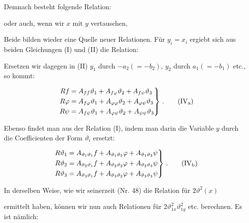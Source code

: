 Demnach besteht folgende Relation:


oder auch, wenn wir $x$ mit $y$ vertauschen,


Beide bilden wieder eine Quelle neuer Relationen. F\"ur $y_i = x_i$ ergiebt sich aus beiden Gleichungen (I) und (II) die Relation:


Ersetzen wir dagegen in (II) $y_1$ durch $-a_2 (= -b_2)$, $y_2$ durch $a_1 (= -b_1)$ etc., so kommt:

\[
\left.
\begin{aligned}
R f &= A_{ff}\vartheta_1 + A_{f\varphi}\vartheta_2 + A_{f\psi}\vartheta_3 \\
R \varphi &= A_{f\varphi}\vartheta_1 + A_{\varphi\varphi}\vartheta_2 + A_{\varphi\psi}\vartheta_3 \\
R \psi &= A_{f\psi}\vartheta_1 + A_{\varphi\psi}\vartheta_2 + A_{\psi\psi}\vartheta_3
\end{aligned}
\right\}\,. \tag{IV$_\text{a}$}
\]

Ebenso findet man aus der Relation (I), indem man darin die Variable $y$ durch die Coefficienten der Form $\vartheta_i$ ersetzt:

\[
\left.
\begin{aligned}
R \vartheta_1 &= A_{\vartheta_1\vartheta_1} f + A_{\vartheta_1\vartheta_2}\varphi + A_{\vartheta_1\vartheta_3}\psi \\
R \vartheta_2 &= A_{\vartheta_2\vartheta_1} f + A_{\vartheta_2\vartheta_2}\varphi + A_{\vartheta_2\vartheta_3}\psi \\
R \vartheta_3 &= A_{\vartheta_3\vartheta_1} f + A_{\vartheta_3\vartheta_2}\varphi + A_{\vartheta_3\vartheta_3}\psi
\end{aligned}
\right\}\,. \tag{IV$_\text{b}$}
\]

In derselben Weise, wie wir seinerzeit (Nr. 48) die Relation f\"ur $2\vartheta^2(x)$



ermittelt haben, k\"onnen wir nun auch Relationen f\"ur $2\vartheta^2_{1x}\vartheta^2_{1y}$ etc. berechnen. Es ist n\"amlich:

